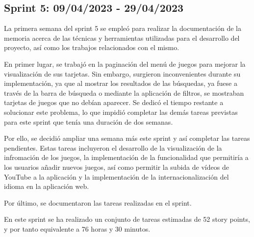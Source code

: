 \subsection{Sprint 5: 09/04/2023 - 29/04/2023}
La primera semana del sprint 5 se empleó para realizar la documentación de la memoria acerca de las técnicas y herramientas utilizadas para el desarrollo del proyecto, así como los trabajos relacionados con el mismo.

En primer lugar, se trabajó en la paginación del menú de juegos para mejorar la visualización de sus tarjetas. Sin embargo, surgieron inconvenientes durante su implementación, ya que al mostrar los resultados de las búsquedas, ya fuese a través de la barra de búsqueda o mediante la aplicación de filtros, se mostraban tarjetas de juegos que no debían aparecer. Se dedicó el tiempo restante a solucionar este problema, lo que impidió completar las demás tareas previstas para este sprint que tenía una duración de dos semanas.

Por ello, se decidió ampliar una semana más este sprint y así completar las tareas pendientes. Estas tareas incluyeron el desarrollo de la visualización de la infromación de los juegos, la implementación de la funcionalidad que permitiría a los usuarios añadir nuevos juegos, así como permitir la subida de vídeos de YouTube a la aplicación y la implementación de la internacionalización del idioma en la aplicación web.

Por último, se documentaron las tareas realizadas en el sprint.

En este sprint se ha realizado un conjunto de tareas estimadas de 52 story points, y por tanto equivalente a 76 horas y 30 minutos.

